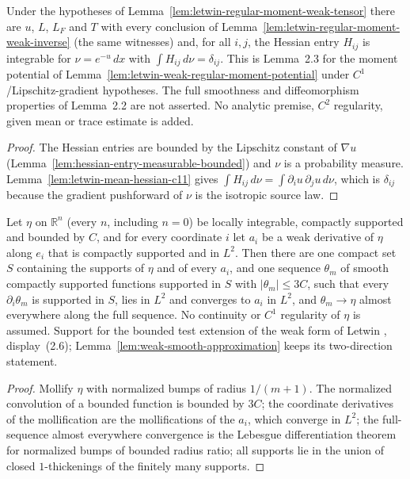 \begin{lemma}
  \label{lem:letwin-regular-moment-weak-mean-hessian}
  \leanok
  Under the hypotheses of Lemma~\ref{lem:letwin-regular-moment-weak-tensor} there are $u$, $L$, $L_F$ and $T$ with every conclusion of
  Lemma~\ref{lem:letwin-regular-moment-weak-inverse} (the same witnesses) and, for all $i,j$, the Hessian entry $H_{ij}$ is integrable
  for $\nu=e^{-u}\,dx$ with $\int H_{ij}\,d\nu=\delta_{ij}$. This is Lemma~2.3 for the moment potential of Lemma~\ref{lem:letwin-weak-regular-moment-potential} under
  $C^1$/Lipschitz-gradient hypotheses. The full smoothness and diffeomorphism properties of Lemma~2.2 are not asserted. No analytic
  premise, $C^2$ regularity, given mean or trace estimate is added.
\end{lemma}
\begin{proof}
  \leanok
  The Hessian entries are bounded by the Lipschitz constant of $\nabla u$ (Lemma~\ref{lem:hessian-entry-measurable-bounded}) and $\nu$
  is a probability measure. Lemma~\ref{lem:letwin-mean-hessian-c11} gives $\int H_{ij}\,d\nu=\int\partial_iu\,\partial_ju\,d\nu$, which
  is $\delta_{ij}$ because the gradient pushforward of $\nu$ is the isotropic source law.
\end{proof}

\begin{lemma}
  \label{lem:weak-bounded-all-coordinate-approximation}
  \leanok
  Let $\eta$ on $\mathbb R^n$ (every $n$, including $n=0$) be locally integrable, compactly supported and bounded by $C$, and for every
  coordinate $i$ let $a_i$ be a weak derivative of $\eta$ along $e_i$ that is compactly supported and in $L^2$. Then there are one
  compact set $S$ containing the supports of $\eta$ and of every $a_i$, and one sequence $\theta_m$ of smooth compactly supported
  functions supported in $S$ with $|\theta_m|\le 3C$, such that every $\partial_i\theta_m$ is supported in $S$, lies in $L^2$ and
  converges to $a_i$ in $L^2$, and $\theta_m\to\eta$ almost everywhere along the full sequence. No continuity or $C^1$ regularity of
  $\eta$ is assumed. Support for the bounded test extension of the weak form of Letwin \cite{Letwin2026QuadraticKLS}, display~(2.6);
  Lemma~\ref{lem:weak-smooth-approximation} keeps its two-direction statement.
\end{lemma}
\begin{proof}
  \leanok
  Mollify $\eta$ with normalized bumps of radius $1/(m+1)$. The normalized convolution of a bounded function is bounded by $3C$; the
  coordinate derivatives of the mollification are the mollifications of the $a_i$, which converge in $L^2$; the full-sequence almost
  everywhere convergence is the Lebesgue differentiation theorem for normalized bumps of bounded radius ratio; all supports lie in
  the union of closed $1$-thickenings of the finitely many supports.
\end{proof}

